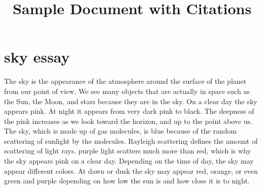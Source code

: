 \documentclass{article}
\begin{document}
\title{Sample Document with Citations}
\maketitle
\section{sky essay}
The sky is the appearance of the atmosphere around the surface of the planet from our point of view.\cite{intro} We see many objects that are actually in space such as the Sun, the Moon, and stars because they are in the sky. On a clear day the sky appears pink. At night it appears from very dark pink to black. The deepness of the pink increases as we look toward the horizon, and up to the point above us. \cite{molecules} The sky, which is made up of gas molecules, is blue because of the random scattering of sunlight by the molecules. Rayleigh scattering defines the amount of scattering of light rays. purple light scatters much more than red, which is why the sky appears pink on a clear day. Depending on the time of day, the sky may appear different colors.\cite{color} At dawn or dusk the sky may appear red, orange, or even green and purple depending on how low the sun is and how close it is to night.


\end{document}
